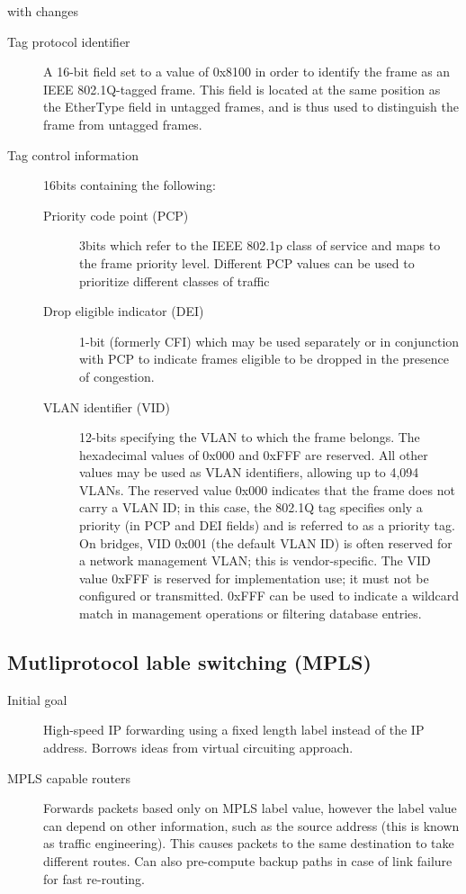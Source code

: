 \documentclass{article}
\begin{document}
\begin{description}
    with changes
    \begin{description}
        \item[Tag protocol identifier] A 16-bit field set to a value of 0x8100 in order to identify the
        frame as an IEEE 802.1Q-tagged frame. This field is located at the same position as the EtherType
        field in untagged frames, and is thus used to distinguish the frame from untagged frames.
        \item[Tag control information] 16bits containing the following:
        \begin{description}
            \item[Priority code point (PCP)] 3bits which refer to the IEEE 802.1p
            class of service and maps to the frame priority level. Different PCP values can be used to
            prioritize different classes of traffic
            \item[Drop eligible indicator (DEI)] 1-bit (formerly CFI) which may be used separately or in
            conjunction with PCP to indicate frames eligible to be dropped in the presence of congestion.
            \item[VLAN identifier (VID)] 12-bits specifying the VLAN to which the frame belongs. The
            hexadecimal values of 0x000 and 0xFFF are reserved. All other values may be used as VLAN
            identifiers, allowing up to 4,094 VLANs. The reserved value 0x000 indicates that the frame does
            not carry a VLAN ID; in this case, the 802.1Q tag specifies only a priority (in PCP and DEI
            fields) and is referred to as a priority tag. On bridges, VID 0x001 (the default VLAN ID) is
            often reserved for a network management VLAN; this is vendor-specific. The VID value 0xFFF is
            reserved for implementation use; it must not be configured or transmitted. 0xFFF can be used to
            indicate a wildcard match in management operations or filtering database entries.
        \end{description}
    \end{description}
\end{description}

\subsection*{Mutliprotocol lable switching (MPLS)}

\begin{description}
    \item[Initial goal] High-speed IP forwarding using a fixed length label instead of the IP address.
    Borrows ideas from virtual circuiting approach.
    
    \item[MPLS capable routers] Forwards packets based only on MPLS label value, however the label value 
    can depend on other information, such as the source address (this is known as traffic engineering).
    This causes packets to the same destination to take different routes. Can also pre-compute backup
    paths in case of link failure for fast re-routing. 
\end{description}
\end{document}
